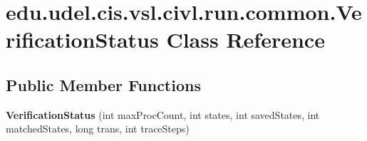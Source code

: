 \hypertarget{classedu_1_1udel_1_1cis_1_1vsl_1_1civl_1_1run_1_1common_1_1VerificationStatus}{}\section{edu.\+udel.\+cis.\+vsl.\+civl.\+run.\+common.\+Verification\+Status Class Reference}
\label{classedu_1_1udel_1_1cis_1_1vsl_1_1civl_1_1run_1_1common_1_1VerificationStatus}
\subsection*{Public Member Functions}
\begin{DoxyCompactItemize}
\item 
\hypertarget{classedu_1_1udel_1_1cis_1_1vsl_1_1civl_1_1run_1_1common_1_1VerificationStatus_a20f8d868d312c208ec8a73bf8cfff8b1}{}{\bfseries Verification\+Status} (int max\+Proc\+Count, int states, int saved\+States, int matched\+States, long trans, int trace\+Steps)\label{classedu_1_1udel_1_1cis_1_1vsl_1_1civl_1_1run_1_1common_1_1VerificationStatus_a20f8d868d312c208ec8a73bf8cfff8b1}

\end{DoxyCompactItemize}
